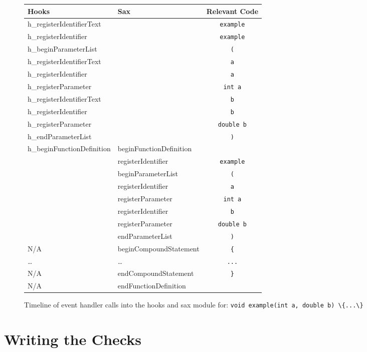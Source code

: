\documentclass[12pt]{report}
\begin{document}
\begin{figure}
\begin{center}
\begin{tabular}{llc}
\toprule
Hooks & Sax  & Relevant Code\\
\midrule
h\_registerIdentifierText & & \lstinline!example! \\
h\_registerIdentifier & & \lstinline!example! \\
h\_beginParameterList & & \lstinline!(! \\
h\_registerIdentifierText & & \lstinline!a! \\
h\_registerIdentifier & & \lstinline!a! \\
h\_registerParameter & & \lstinline!int a! \\
h\_registerIdentifierText & & \lstinline!b! \\
h\_registerIdentifier & & \lstinline!b! \\
h\_registerParameter & & \lstinline!double b! \\
h\_endParameterList & & \lstinline!)! \\
h\_beginFunctionDefinition & beginFunctionDefinition & \\
 & registerIdentifier & \lstinline!example! \\
 & beginParameterList & \lstinline!(! \\
 & registerIdentifier & \lstinline!a! \\
 & registerParameter & \lstinline!int a! \\
 & registerIdentifier & \lstinline!b!\\
 & registerParameter & \lstinline!double b!\\
 & endParameterList & \lstinline!)!\\
N/A & beginCompoundStatement & \lstinline!{!\\
\ldots & \ldots & \lstinline!...! \\
N/A & endCompoundStatement & \lstinline!}!\\
N/A & endFunctionDefinition \\
 \bottomrule
\end{tabular}
\end{center}
\caption[Timeline of Event Handler Calls]{Timeline of event handler calls into the hooks and sax module for: \lstinline!void example(int a, double b) \{...\}!}
\label{handlerTimeline}
\end{figure}
\newpage

\section{Writing the Checks}
\label{writingTheChecks}
\end{document}
